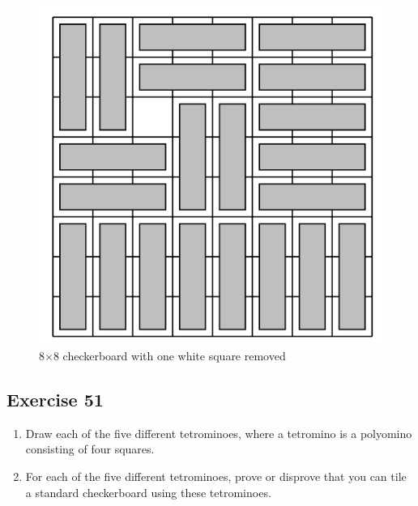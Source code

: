 \documentclass{article}
\begin{document}
\begin{figure}
    \begin{center}
        \includegraphics{8x8CheckerboardTri.png}
        \caption{8$ \times $8 checkerboard with one white square removed}
    \end{center}
\end{figure}
\subsection*{Exercise 51}
\begin{enumerate} [label = (\alph*)]
    \item Draw each of the five different tetrominoes, where a tetromino is a polyomino consisting of four squares.
    \item For each of the five different tetrominoes, prove or disprove that you can tile a standard checkerboard using these tetrominoes.
\end{enumerate}
\clearpage
\end{document}
